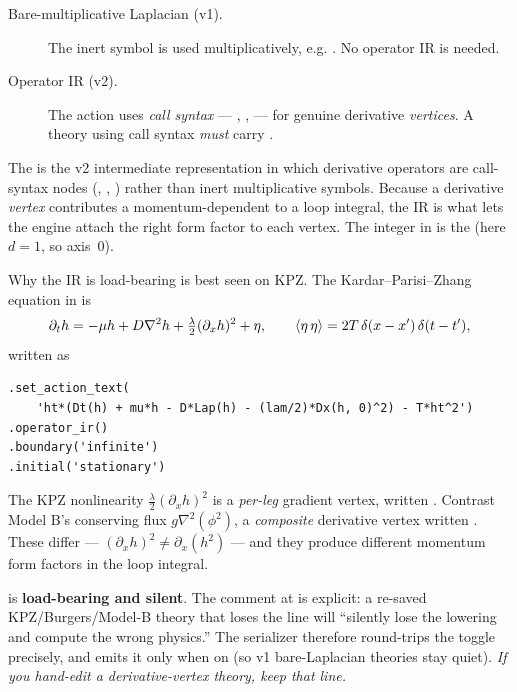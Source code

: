 \begin{description}
  \item[Bare-multiplicative Laplacian (v1).] The inert symbol  is
        used multiplicatively, e.g. . No
        operator IR is needed.
  \item[Operator IR (v2).] The action uses \emph{call syntax} --- ,
        ,  --- for genuine derivative \emph{vertices}.
        A theory using call syntax \emph{must} carry .
\end{description}

\begin{defn}
The  is the v2 intermediate representation in which derivative
operators are call-syntax nodes (, , )
rather than inert multiplicative symbols. Because a derivative \emph{vertex}
contributes a momentum-dependent  to a loop integral, the IR is
what lets the engine attach the right form factor to each vertex. The integer in
 is the  (here $d=1$, so axis~0).
\end{defn}

Why the IR is load-bearing is best seen on KPZ. The Kardar--Parisi--Zhang
equation in  is
\[
  \partial_t h = -\mu h + D\nabla^{2}h + \tfrac{\lambda}{2}(\partial_x h)^{2} + \eta,
  \qquad \left\langle \eta\,\eta \right\rangle = 2T\,\delta(x-x')\,\delta(t-t'),
\]
written as

\begin{lstlisting}
.set_action_text(
    'ht*(Dt(h) + mu*h - D*Lap(h) - (lam/2)*Dx(h, 0)^2) - T*ht^2')
.operator_ir()
.boundary('infinite')
.initial('stationary')
\end{lstlisting}

The KPZ nonlinearity $\tfrac{\lambda}{2}(\partial_x h)^{2}$ is a \emph{per-leg}
gradient vertex, written . Contrast Model B's conserving flux
$g\nabla^{2}(\phi^{2})$, a \emph{composite} derivative vertex written
. These differ --- $(\partial_x h)^{2} \neq
\partial_x(h^{2})$ --- and they produce different momentum form factors in the
loop integral.

\begin{gotcha}
 is \textbf{load-bearing and silent}. The comment at
 is explicit: a re-saved
KPZ/Burgers/Model-B theory that loses the  line will
``silently lose the  lowering and compute the wrong
physics.'' The serializer therefore round-trips the toggle precisely, and emits it
only when on (so v1 bare-Laplacian theories stay quiet). \emph{If you hand-edit a
derivative-vertex theory, keep that line.}
\end{gotcha}

